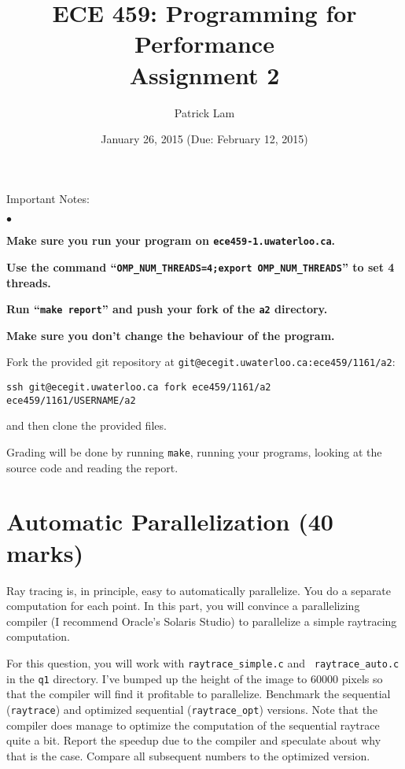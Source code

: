 \documentclass[letterpaper,10pt]{article}
\title{\bf ECE 459: Programming for Performance\\Assignment 2}
\author{Patrick Lam}
\date{January 26, 2015 (Due: February 12, 2015)}
\begin{document}
\maketitle
\newcommand{\squishlist}{
 \begin{list}{$\bullet$}
  { \setlength{\itemsep}{0pt}
     \setlength{\parsep}{3pt}
     \setlength{\topsep}{3pt}
     \setlength{\partopsep}{0pt}
     \setlength{\leftmargin}{1.5em}
     \setlength{\labelwidth}{1em}
     \setlength{\labelsep}{0.5em} } }
\newcommand{\squishend}{
  \end{list}  }

\noindent
Important Notes:

\squishlist
  \item {\bf Make sure you run your program on {\tt ece459-1.uwaterloo.ca}.}
  \item {\bf Use the command ``{\tt OMP\_NUM\_THREADS=4;export OMP\_NUM\_THREADS}'' to set 4 threads.}
  \item {\bf Run ``{\tt make report}'' and push your fork of the {\tt a2} directory.}
  \item {\bf Make sure you don't change the behaviour of the program.}
\squishend

\noindent
Fork the provided git repository at {\tt git@ecegit.uwaterloo.ca:ece459/1161/a2}:
\begin{center}
{\tt ssh git@ecegit.uwaterloo.ca fork ece459/1161/a2 ece459/1161/USERNAME/a2}
\end{center}
\noindent and then clone the provided files.

Grading will be done by running {\tt make}, running your programs,
looking at the source code and reading the report.

\section*{Automatic Parallelization (40 marks)}
Ray tracing is, in principle, easy to automatically parallelize. You do
a separate computation for each point. In this part, you will convince a
parallelizing compiler (I recommend Oracle's Solaris Studio) to parallelize
a simple raytracing computation.

For this question, you will work with {\tt raytrace\_simple.c} and {\tt
  raytrace\_auto.c} in the {\tt q1} directory.  I've bumped up the
height of the image to 60000 pixels so that the compiler will find it
profitable to parallelize. Benchmark the sequential ({\tt raytrace})
and optimized sequential ({\tt raytrace\_opt}) versions. Note that the
compiler does manage to optimize the computation of the sequential
raytrace quite a bit. Report the speedup due to the compiler and
speculate about why that is the case. Compare all subsequent numbers
to the optimized version.
\end{document}
